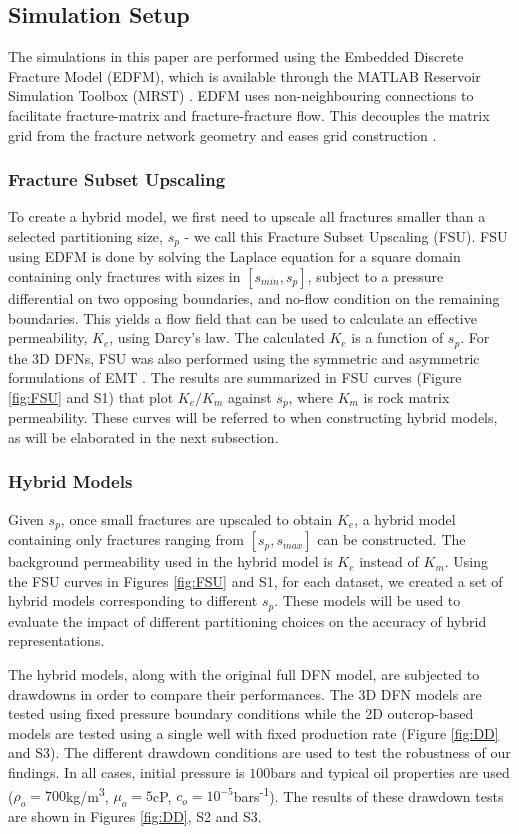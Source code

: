 \documentclass[draft]{agujournal2018}
\begin{document}
\subsection{Simulation Setup}
The simulations in this paper are performed using the Embedded Discrete Fracture Model (EDFM), which is available through the MATLAB Reservoir Simulation Toolbox (MRST) \citep{Lie2012}. EDFM uses non-neighbouring connections to facilitate fracture-matrix and fracture-fracture flow. This decouples the matrix grid from the fracture network geometry and eases grid construction \citep{Lee2001, Li2008, Moinfar2014, Shah2016}. 

\subsubsection{Fracture Subset Upscaling}
To create a hybrid model, we first need to upscale all fractures smaller than a selected partitioning size, $s_p$ - we call this Fracture Subset Upscaling (FSU). FSU using EDFM is done by solving the Laplace equation for a square domain containing only fractures with sizes in $[s_{min},s_p]$, subject to a pressure differential on two opposing boundaries, and no-flow condition on the remaining boundaries. This yields a flow field that can be used to calculate an effective permeability, $K_{e}$, using Darcy's law. The calculated $K_{e}$ is a function of $s_p$. For the 3D DFNs, FSU was also performed using the symmetric and asymmetric formulations of EMT \citep{Saevik2013}. The results are summarized in FSU curves (Figure \ref{fig:FSU} and S1) that plot $K_{e}/K_m$ against $s_p$, where $K_m$ is rock matrix permeability. These curves will be referred to when constructing hybrid models, as will be elaborated in the next subsection.

\subsubsection{Hybrid Models}
Given $s_p$, once small fractures are upscaled to obtain $K_e$, a hybrid model containing only fractures ranging from $[s_p,s_{max}]$ can be constructed. The background permeability used in the hybrid model is $K_e$ instead of $K_m$. Using the FSU curves in Figures \ref{fig:FSU} and S1, for each dataset, we created a set of hybrid models corresponding to different $s_p$. These models will be used to evaluate the impact of different partitioning choices on the accuracy of hybrid representations.

The hybrid models, along with the original full DFN model, are subjected to drawdowns in order to compare their performances. The 3D DFN models are tested using fixed pressure boundary conditions while the 2D outcrop-based models are tested using a single well with fixed production rate (Figure \ref{fig:DD} and S3). The different drawdown conditions are used to test the robustness of our findings. In all cases, initial pressure is $100$bars and typical oil properties are used ($\rho_o=700$kg/m\textsuperscript{3}, $\mu_o=5$cP, $c_o=10^{-5}$bars\textsuperscript{-1}). The results of these drawdown tests are shown in Figures \ref{fig:DD}, S2 and S3.
\end{document}
